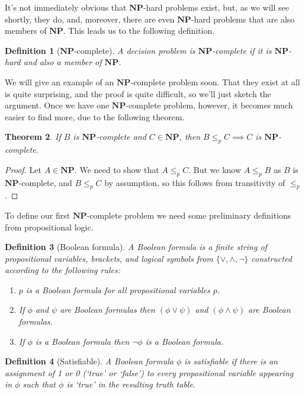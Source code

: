 \documentclass{article}
\theoremstyle{plain}
\newtheorem{theorem}{Theorem}[section]{\bfseries}{\itshape}
\newtheorem{definition}[theorem]{Definition}{\bfseries}{\upshape}
\theoremstyle{definition}
\newcommand{\NP}{\mathbf{NP}}
\begin{document}
It's not immediately obvious that $\NP$-hard problems exist, but, as we will see shortly, they do, and, moreover, there are even $\NP$-hard problems that are also members of $\NP$. This leads us to the following definition.

\begin{definition}[$\NP$-complete]
A decision problem is $\NP$-complete if it is $\NP$-hard and also a member of $\NP$.
\end{definition} 

We will give an example of an $\NP$-complete problem soon. That they exist at all is quite surprising, and the proof is quite difficult, so we'll just sketch the argument. Once we have one $\NP$-complete problem, however, it becomes much easier to find more, due to the following theorem.

\begin{theorem}\label{T:ctrans}
If $B$ is $\NP$-complete and $C\in\NP$, then $B\leq_p C\implies C$ is $\NP$-complete.
\end{theorem}
\begin{proof}
Let $A\in \NP$. We need to show that $A\leq_p C$. But we know $A\leq_p B$ as $B$ is $\NP$-complete, and $B\leq_p C$ by assumption, so this follows from transitivity of $\leq_p$.
\end{proof}

To define our first $\NP$-complete problem we need some preliminary definitions from propositional logic.

\begin{definition}[Boolean formula]
A Boolean formula is a finite string of propositional variables, brackets, and logical symbols from $\{\vee,\wedge,\neg\}$ constructed according to the following rules:
\begin{enumerate}
\item $p$ is a Boolean formula for all propositional variables $p$.
\item If $\phi$ and $\psi$ are Boolean formulas then $(\phi\vee\psi)$ and $(\phi\wedge\psi)$ are Boolean formulas.
\item If $\phi$ is a Boolean formula then $\neg\phi$ is a Boolean formula.
\end{enumerate} 
\end{definition}

\begin{definition}[Satisfiable]
A Boolean formula $\phi$ is satisfiable if there is an assignment of 1 or 0 (`true' or `false') to every propositional variable appearing in $\phi$ such that $\phi$ is `true' in the resulting truth table.
\end{definition}
\end{document}
